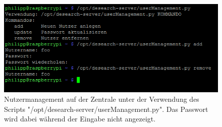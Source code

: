 \begin{figure}
	\centering
	\includegraphics[width=1.0\linewidth]{images/userManagement}
	\caption[Nutzermanagement auf der Zentrale]{Nutzermanagement auf der Zentrale unter der Verwendung des Scripts "/opt/desearch-server/userManagement.py". Das Passwort wird dabei während der Eingabe nicht angezeigt.}
	\label{img:userManagement}
\end{figure}


